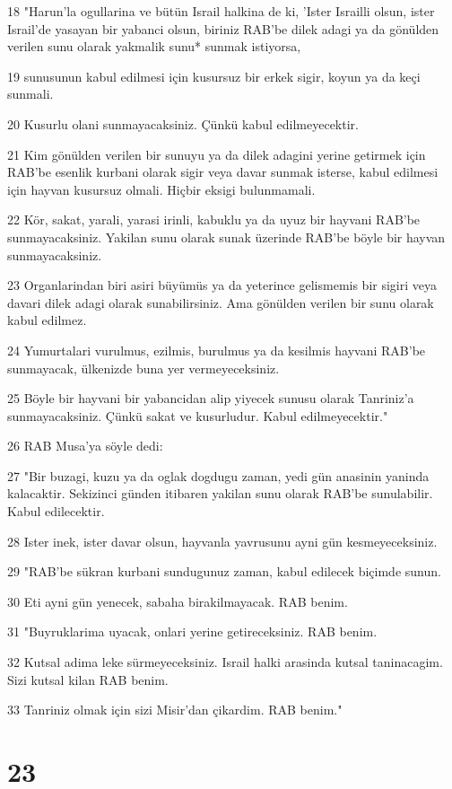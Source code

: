 \par 18 "Harun'la ogullarina ve bütün Israil halkina de ki, 'Ister Israilli olsun, ister Israil'de yasayan bir yabanci olsun, biriniz RAB'be dilek adagi ya da gönülden verilen sunu olarak yakmalik sunu* sunmak istiyorsa,
\par 19 sunusunun kabul edilmesi için kusursuz bir erkek sigir, koyun ya da keçi sunmali.
\par 20 Kusurlu olani sunmayacaksiniz. Çünkü kabul edilmeyecektir.
\par 21 Kim gönülden verilen bir sunuyu ya da dilek adagini yerine getirmek için RAB'be esenlik kurbani olarak sigir veya davar sunmak isterse, kabul edilmesi için hayvan kusursuz olmali. Hiçbir eksigi bulunmamali.
\par 22 Kör, sakat, yarali, yarasi irinli, kabuklu ya da uyuz bir hayvani RAB'be sunmayacaksiniz. Yakilan sunu olarak sunak üzerinde RAB'be böyle bir hayvan sunmayacaksiniz.
\par 23 Organlarindan biri asiri büyümüs ya da yeterince gelismemis bir sigiri veya davari dilek adagi olarak sunabilirsiniz. Ama gönülden verilen bir sunu olarak kabul edilmez.
\par 24 Yumurtalari vurulmus, ezilmis, burulmus ya da kesilmis hayvani RAB'be sunmayacak, ülkenizde buna yer vermeyeceksiniz.
\par 25 Böyle bir hayvani bir yabancidan alip yiyecek sunusu olarak Tanriniz'a sunmayacaksiniz. Çünkü sakat ve kusurludur. Kabul edilmeyecektir."
\par 26 RAB Musa'ya söyle dedi:
\par 27 "Bir buzagi, kuzu ya da oglak dogdugu zaman, yedi gün anasinin yaninda kalacaktir. Sekizinci günden itibaren yakilan sunu olarak RAB'be sunulabilir. Kabul edilecektir.
\par 28 Ister inek, ister davar olsun, hayvanla yavrusunu ayni gün kesmeyeceksiniz.
\par 29 "RAB'be sükran kurbani sundugunuz zaman, kabul edilecek biçimde sunun.
\par 30 Eti ayni gün yenecek, sabaha birakilmayacak. RAB benim.
\par 31 "Buyruklarima uyacak, onlari yerine getireceksiniz. RAB benim.
\par 32 Kutsal adima leke sürmeyeceksiniz. Israil halki arasinda kutsal taninacagim. Sizi kutsal kilan RAB benim.
\par 33 Tanriniz olmak için sizi Misir'dan çikardim. RAB benim."

\chapter{23}

